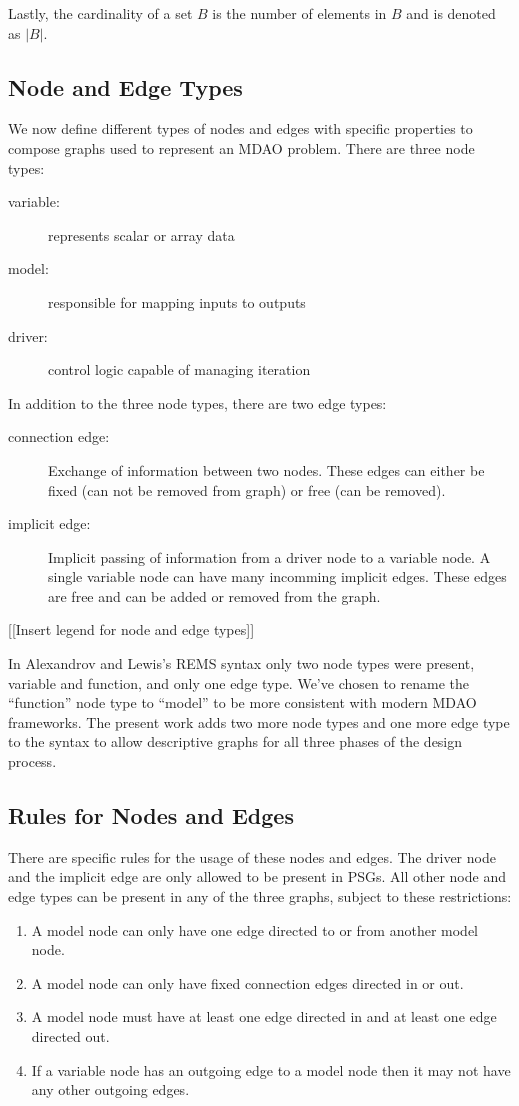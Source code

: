 Lastly, the cardinality of a set $B$ is the number of elements in $B$ and is denoted as $|B|$.


\subsection{Node and Edge Types}
We now define different types of nodes and edges with specific properties to compose graphs used to represent an MDAO problem. 
There are three node types:  
\begin{description}
\item[variable: ] represents scalar or array data
\item[model:] responsible for mapping inputs to outputs
\item[driver:] control logic capable of managing iteration
\end{description}

In addition to the three node types, there are two edge types: 

\begin{description}
\item[connection edge:] Exchange of information between two nodes. These edges 
can either be fixed (can not be removed from graph) or free (can be removed). 
\item [implicit edge:] Implicit passing of information from a driver node to a 
  variable node. A single variable node can have many incomming implicit edges. These edges are 
  free and can be added or removed from the graph. 
\end{description}

[[Insert legend for node and edge types]]

In Alexandrov and Lewis's REMS syntax only two node types were present, variable 
and function, and only one edge type\cite{alexandrov2004}. We've chosen to rename the ``function'' node 
type to ``model'' to be more consistent with modern MDAO frameworks. The present work 
adds two more node types and one more edge type to the syntax to allow descriptive
graphs for all three phases of the design process. 

\subsection{Rules for Nodes and Edges}
There are specific rules for the usage of these nodes and edges.
The driver node and the implicit edge are only allowed to be present in PSGs. All 
other node and edge types can be present in any of the three graphs, subject to these restrictions: 
\begin{enumerate}
\item A model node can only have one edge directed to or from another model node.
\item A model node can only have fixed connection edges directed in or out.
\item A model node must have at least one edge directed in and at least one edge 
  directed out.
\item If a variable node has an outgoing edge to a model node then it may not have 
  any other outgoing edges.
\end{enumerate}


